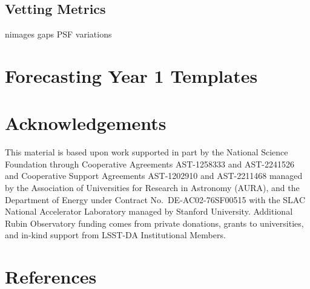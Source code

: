 \documentclass[DM,lsstdraft,authoryear,toc]{lsstdoc}
\begin{document}
\subsection{Vetting Metrics}

nimages
gaps
PSF variations

\section{Forecasting Year 1 Templates} \label{sec:forecast}




\section{Acknowledgements}

This material is based upon work supported in part by the National Science Foundation through Cooperative Agreements AST-1258333 and AST-2241526 and Cooperative Support Agreements AST-1202910 and AST-2211468 managed by the Association of Universities for Research in Astronomy (AURA), and the Department of Energy under Contract No.\ DE-AC02-76SF00515 with the SLAC National Accelerator Laboratory managed by Stanford University.
Additional Rubin Observatory funding comes from private donations, grants to universities, and in-kind support from LSST-DA Institutional Members.

\section{References} \label{sec:bib}
\renewcommand{\refname}{} %


%
\end{document}
